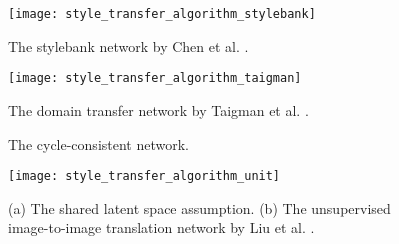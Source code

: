\begin{figure}
	\centering
	\texttt{[image: style\_transfer\_algorithm\_stylebank]}%
	\caption{
		The stylebank network by Chen et al. \cite{Chen2017}.
	}
	\label{fig:style_transfer_algorithm_stylebank}
\end{figure}
\begin{figure}
	\centering
	\texttt{[image: style\_transfer\_algorithm\_taigman]}%
	\caption{
		The domain transfer network by Taigman et al. \cite{Taigman2016}.
	}
	\label{fig:style_transfer_algorithm_taigman}
\end{figure}
\begin{figure}
	\centering
	
	\caption{
		The cycle-consistent network.
	}
	\label{fig:style_transfer_cyclegan}
\end{figure}
\begin{figure}
	\centering
	\texttt{[image: style\_transfer\_algorithm\_unit]}%
	\caption{
		(a) The shared latent space assumption.
		(b) The unsupervised image-to-image translation network by Liu et al. \cite{Liu2017}.
	}
	\label{fig:style_transfer_algorithm_unit}
\end{figure}
\label{sec:ist}